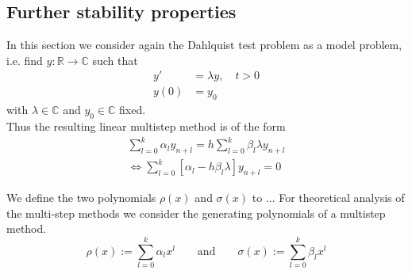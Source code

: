 	
	
	\subsection{Further stability properties}
	
	In this section we consider again the Dahlquist test problem as a model problem, i.e. find $y:\mathbb{R} \to \mathbb{C}$ such that
	\begin{align}
		y' &= \lambda y, \quad t > 0 \\
		y(0) &= y_0
	\end{align}
	with $\lambda \in \mathbb{C}$ and $y_0 \in \mathbb{C}$ fixed.\\
	
	
	Thus the resulting linear multistep method is of the form
	\begin{align*}
		\sum_{l=0}^{k} \alpha_l y_{n+l} = h \sum_{l=0}^{k} \beta_l \lambda y_{n+l} \\
		\iff \sum_{l=0}^{k}  [\alpha_l - h \beta_l \lambda] y_{n+l} = 0
	\end{align*}
	
	
	We define the two polynomials $\rho(x)$ and $\sigma(x)$ to ...
	For theoretical analysis of the multi-step methods we consider the generating polynomials of a multistep method.
	\begin{equation}
		\label{eq:generating polynomials multistep method}
		\rho(x) := \sum_{l=0}^{k} \alpha_l x^l
		\qquad \text{and} \qquad
		\sigma(x) := \sum_{l=0}^{k} \beta_l x^l
	\end{equation}
	

